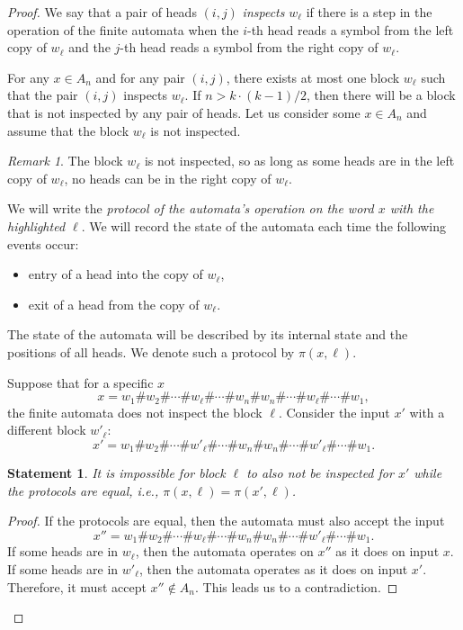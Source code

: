 \documentclass[12pt,sans]{article}
\theoremstyle{definition}
\theoremstyle{plain}
\newtheorem{statement}{Statement}[section]
\theoremstyle{remark}
\newtheorem{remark}{Remark}[section]
\begin{document}
\begin{proof}
    We say that a pair of heads $(i,j)$ \emph{inspects} $w_\ell$ if there is a step in the operation of the finite automata when the $i$-th head reads a symbol from the left copy of $w_\ell$ and the $j$-th head reads a symbol from the right copy of $w_\ell$.

    For any $x \in A_n$ and for any pair $(i,j)$, there exists at most one block $w_\ell$ such that the pair $(i,j)$ inspects $w_\ell$. If $n > k \cdot (k-1)/2$, then there will be a block that is not inspected by any pair of heads. Let us consider some $x \in A_n$ and assume that the block $w_\ell$ is not inspected.

    \begin{remark}
        The block $w_\ell$ is not inspected, so as long as some heads are in the left copy of $w_\ell$, no heads can be in the right copy of $w_\ell$.
    \end{remark}

    We will write the \emph{protocol of the automata's operation on the word $x$ with the highlighted $\ell$}. We will record the state of the automata each time the following events occur:
    \begin{itemize}
        \item entry of a head into the copy of $w_\ell$,
        \item exit of a head from the copy of $w_\ell$.
    \end{itemize}
    The state of the automata will be described by its internal state and the positions of all heads. We denote such a protocol by $\pi(x,\ell)$.

    Suppose that for a specific $x$
    \[
    x = w_1\#w_2\#\dotsb\#w_\ell\#\dotsb\#w_n\#w_n\#\dotsb\#w_\ell\#\dotsb\#w_1,
    \]
    the finite automata does not inspect the block $\ell$. Consider the input $x'$ with a different block $w'_\ell$:
    \[
    x' = w_1\#w_2\#\dotsb\#w'_\ell\#\dotsb\#w_n\#w_n\#\dotsb\#w'_\ell\#\dotsb\#w_1.
    \]

    \begin{statement}
        It is impossible for block $\ell$ to also not be inspected for $x'$ while the protocols are equal, i.e., $\pi(x,\ell) = \pi(x',\ell)$.
    \end{statement}

    \begin{proof}
        If the protocols are equal, then the automata must also accept the input
        \[
        x'' = w_1\#w_2\#\dotsb\#w_\ell\#\dotsb\#w_n\#w_n\#\dotsb\#w'_\ell\#\dotsb\#w_1.
        \]
        If some heads are in $w_\ell$, then the automata operates on $x''$ as it does on input $x$. If some heads are in $w'_\ell$, then the automata operates as it does on input $x'$. Therefore, it must accept $x'' \not\in A_n$. This leads us to a contradiction.
    \end{proof}


\end{proof}
\end{document}
